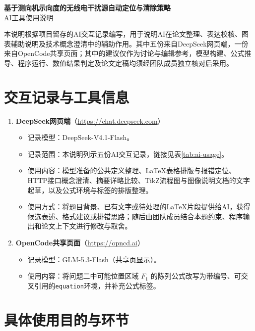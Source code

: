 \documentclass[12pt,a4paper]{article}
\begin{document}
\begin{center}
    {\LARGE\bfseries 基于测向机示向度的无线电干扰源自动定位与清除策略}\\[1em]
    {\large AI工具使用说明}
\end{center}

\vspace{1em}

本说明根据项目留存的AI交互记录编写，用于说明AI在论文整理、表达校核、图表辅助说明及技术概念澄清中的辅助作用。其中五份来自DeepSeek网页端，一份来自OpenCode共享页面；其中的建议仅作为讨论与编辑参考，模型构建、公式推导、程序运行、数值结果判定及论文定稿均须经团队成员独立核对后采用。

\section{交互记录与工具信息}

\begin{enumerate}
    \item \textbf{DeepSeek网页端}（\url{https://chat.deepseek.com}）
    \begin{itemize}
        \item 记录模型：DeepSeek-V4.1-Flash。
        \item 记录范围：本说明列示五份AI交互记录，链接见表\ref{tab:ai-usage}。
        \item 使用内容：模型准备的公共定义整理、LaTeX表格排版与报错定位、HTTP接口概念澄清、摘要详略比较、TikZ流程图与图像说明文档的文字起草，以及公式环境与标签的排版整理。
        \item 使用方式：将题目背景、已有文字或待处理的LaTeX片段提供给AI，获得候选表述、格式建议或排错思路；随后由团队成员结合本题约束、程序输出和论文上下文进行修改与取舍。
    \end{itemize}
    \item \textbf{OpenCode共享页面}（\url{https://opncd.ai}）
    \begin{itemize}
        \item 记录模型：GLM-5.3-Flash（共享页显示）。
        \item 使用内容：将问题二中可能位置区域 $F_1$ 的陈列公式改写为带编号、可交叉引用的\texttt{equation}环境，并补充公式标签。
    \end{itemize}
\end{enumerate}

\section{具体使用目的与环节}
\end{document}
